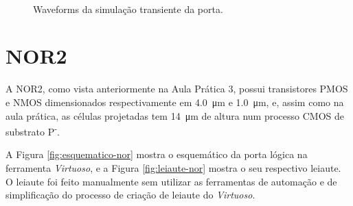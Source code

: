 \documentclass{iiufrgs}
\newcommand{\virtuoso}{\textit{Virtuoso}}
\begin{document}
\begin{figure}[htbp]
    \centering
    \caption{Waveforms da simulação transiente da porta.}
     \\
    \label{fig:wave-nand}
\end{figure}

\FloatBarrier

\section{NOR2}\label{nor}
A NOR2, como vista anteriormente na Aula Prática 3, possui transistores PMOS e NMOS dimensionados respectivamente em \SI{4.0}{\um} e \SI{1.0}{\um}, e, assim como na aula prática, as células projetadas tem \SI{14}{\um} de altura num processo CMOS de substrato P\textsuperscript{-}.

A Figura \ref{fig:esquematico-nor} mostra o esquemático da porta lógica na ferramenta \virtuoso, e a Figura \ref{fig:leiaute-nor} mostra o seu respectivo leiaute. O leiaute foi feito manualmente sem utilizar as ferramentas de automação e de simplificação do processo de criação de leiaute do \virtuoso.
\end{document}

